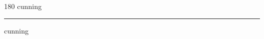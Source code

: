 
\begin{frame}
\begin{center}
\begin{turn}{180}
{\fontsize{2.5cm}{1em}\selectfont cunning}
\end{turn}
\vspace{1em}\par  
\hrule
\vspace{1em}\par  
{\fontsize{2.5cm}{1em}\selectfont cunning}
\end{center}
\end{frame}
